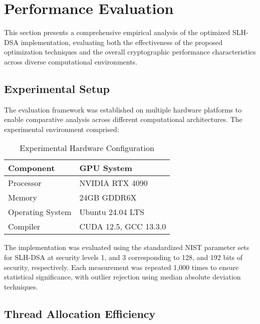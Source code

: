 \documentclass[journal]{IEEEtran}
\begin{document}

\section{Performance Evaluation}\label{sec:evaluation}

This section presents a comprehensive empirical analysis of the optimized SLH-DSA implementation, evaluating both the effectiveness of the proposed optimization techniques and the overall cryptographic performance characteristics across diverse computational environments.

\subsection{Experimental Setup}

The evaluation framework was established on multiple hardware platforms to enable comparative analysis across different computational architectures. The experimental environment comprised:

\begin{table}[h]
  \centering
  \caption{Experimental Hardware Configuration}
  \label{tab:hardware_config}
  \begin{tabular}{@{}ll@{}}
    \toprule
    \textbf{Component} & \textbf{GPU System} \\
    \midrule
    Processor & NVIDIA RTX 4090 \\
    Memory & 24GB GDDR6X \\
    Operating System & Ubuntu 24.04 LTS \\
    Compiler & CUDA 12.5, GCC 13.3.0 \\
    \bottomrule
  \end{tabular}
\end{table}

The implementation was evaluated using the standardized NIST parameter sets for SLH-DSA at security levels 1, and 3 corresponding to 128, and 192 bits of security, respectively. Each measurement was repeated 1,000 times to ensure statistical significance, with outlier rejection using median absolute deviation techniques.

\subsection{Thread Allocation Efficiency}
\end{document}
